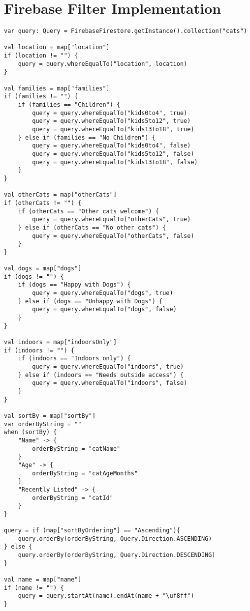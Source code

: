 \section{Firebase Filter Implementation} \label{FIRESTOREQUERYIMPLEMENTATION}
\begin{verbatim}
var query: Query = FirebaseFirestore.getInstance().collection("cats")

val location = map["location"]
if (location != "") {
    query = query.whereEqualTo("location", location)
}

val families = map["families"]
if (families != "") {
    if (families == "Children") {
        query = query.whereEqualTo("kids0to4", true)
        query = query.whereEqualTo("kids5to12", true)
        query = query.whereEqualTo("kids13to18", true)
    } else if (families == "No Children") {
        query = query.whereEqualTo("kids0to4", false)
        query = query.whereEqualTo("kids5to12", false)
        query = query.whereEqualTo("kids13to18", false)
    }
}

val otherCats = map["otherCats"]
if (otherCats != "") {
    if (otherCats == "Other cats welcome") {
        query = query.whereEqualTo("otherCats", true)
    } else if (otherCats == "No other cats") {
        query = query.whereEqualTo("otherCats", false)
    }
}

val dogs = map["dogs"]
if (dogs != "") {
    if (dogs == "Happy with Dogs") {
        query = query.whereEqualTo("dogs", true)
    } else if (dogs == "Unhappy with Dogs") {
        query = query.whereEqualTo("dogs", false)
    }
}

val indoors = map["indoorsOnly"]
if (indoors != "") {
    if (indoors == "Indoors only") {
        query = query.whereEqualTo("indoors", true)
    } else if (indoors == "Needs outside access") {
        query = query.whereEqualTo("indoors", false)
    }
}

val sortBy = map["sortBy"]
var orderByString = ""
when (sortBy) {
    "Name" -> {
        orderByString = "catName"
    }
    "Age" -> {
        orderByString = "catAgeMonths"
    }
    "Recently Listed" -> {
        orderByString = "catId"
    }
}

query = if (map["sortByOrdering"] == "Ascending"){
    query.orderBy(orderByString, Query.Direction.ASCENDING)
} else {
    query.orderBy(orderByString, Query.Direction.DESCENDING)
}

val name = map["name"]
if (name != "") {
    query = query.startAt(name).endAt(name + "\uf8ff")
}
\end{verbatim}

